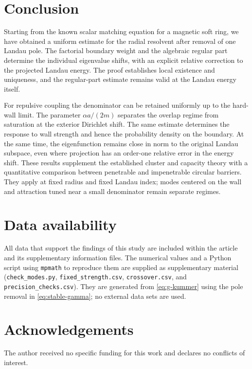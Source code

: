 \documentclass[12pt,a4paper]{article}
\numberwithin{equation}{section}
\theoremstyle{remark}
\theoremstyle{definition}
\begin{document}
\section{Conclusion}\label{sec:conclusion}

Starting from the known scalar matching equation for a magnetic soft ring,
we have obtained a uniform estimate for the radial resolvent after removal
of one Landau pole. The factorial boundary weight and the algebraic
regular part determine the individual eigenvalue shifts, with an explicit
relative correction to the projected Landau energy. The proof establishes
local existence and uniqueness, and the regular-part estimate remains
valid at the Landau energy itself.

For repulsive coupling the denominator can be retained uniformly up to
the hard-wall limit. The parameter $\alpha a/(2m)$ separates the overlap
regime from saturation at the exterior Dirichlet shift. The same estimate
determines the response to wall strength and hence the probability density
on the boundary. At the same time, the eigenfunction remains close in norm
to the original Landau subspace, even where projection has an order-one
relative error in the energy shift. These results supplement the established cluster and
capacity theory with a quantitative comparison between penetrable and
impenetrable circular barriers. They apply at fixed radius and fixed
Landau index; modes centered on the wall and attraction tuned near a
small denominator remain separate regimes.

\section*{Data availability}
All data that support the findings of this study are included within the
article and its supplementary information files. The numerical values and a
Python script using \texttt{mpmath} to reproduce them are supplied as
supplementary material
(\texttt{check\_modes.py}, \texttt{fixed\_strength.csv},
\texttt{crossover.csv}, and \texttt{precision\_checks.csv}). They are generated
from \eqref{eq:g-kummer} using the pole removal in
\eqref{eq:stable-gamma}; no external data sets are used.

\section*{Acknowledgements}
The author received no specific funding for this work and declares no
conflicts of interest.
\end{document}
